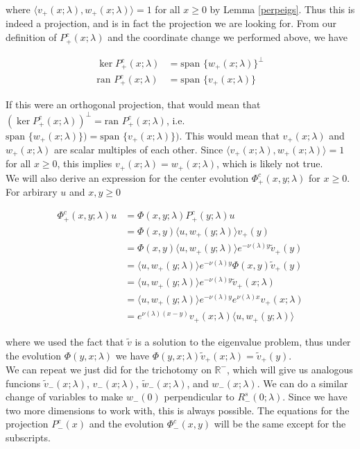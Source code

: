 \documentclass[12pt]{article}
\def\R{{\mathbb R}}
\begin{document}
where $\langle v_+(x; \lambda), w_+(x; \lambda) \rangle = 1$ for all $x \geq 0$ by Lemma \ref{perpeigs}. Thus this is indeed a projection, and is in fact the projection we are looking for. From our definition of $P^c_+(x; \lambda)$ and the coordinate change we performed above, we have

\begin{align*}
\ker P^c_+(x; \lambda) &= \text{span }\{ w_+(x; \lambda) \}^\perp\\
\text{ran } P^c_+(x; \lambda) &= \text{span }\{ v_+(x; \lambda) \}
\end{align*}

If this were an orthogonal projection, that would mean that $(\ker P^c_+(x; \lambda))^\perp = \text{ran } P^c_+(x; \lambda)$, i.e. $\text{span }\{ w_+(x; \lambda) \}) = \text{span }\{ v_+(x; \lambda) \})$. This would mean that $v_+(x; \lambda)$ and $w_+(x; \lambda)$ are scalar multiples of each other. Since $\langle v_+(x; \lambda), w_+(x; \lambda) \rangle = 1$ for all $x \geq 0$, this implies $v_+(x; \lambda) = w_+(x; \lambda)$, which is likely not true. \\

We will also derive an expression for the center evolution $\Phi^c_+(x,y; \lambda)$ for $x \geq 0$. For arbirary $u$ and $x, y \geq 0$

\begin{align*}
\Phi^c_+(x,y; \lambda)u &= \Phi(x,y; \lambda) P^c_+(y; \lambda) u \\
&= \Phi(x,y) \langle u, w_+(y; \lambda) \rangle v_+(y) \\
&= \Phi(x,y) \langle u, w_+(y; \lambda) \rangle e^{-\nu(\lambda)y} \tilde{v}_+(y) \\
&= \langle u, w_+(y; \lambda) \rangle e^{-\nu(\lambda)y} \Phi(x,y) \tilde{v}_+(y) \\
&= \langle u, w_+(y; \lambda) \rangle e^{-\nu(\lambda)y} \tilde{v}_+(x; \lambda) \\
&= \langle u, w_+(y; \lambda) \rangle e^{-\nu(\lambda)y} e^{\nu(\lambda)x} v_+(x; \lambda) \\
&= e^{\nu(\lambda)(x-y)} v_+(x; \lambda) \langle u, w_+(y; \lambda) \rangle 
\end{align*}

where we used the fact that $\tilde{v}$ is a solution to the eigenvalue problem, thus under the evolution $\Phi(y, x; \lambda)$ we have $\Phi(y, x; \lambda)\tilde{v}_+(x; \lambda) = \tilde{v}_+(y)$.\\

We can repeat we just did for the trichotomy on $\R^-$, which will give us analogous funcions $\tilde{v}_-(x; \lambda)$, $v_-(x; \lambda)$, $\tilde{w}_-(x; \lambda)$, and $w_-(x; \lambda)$. We can do a similar change of variables to make $w_-(0)$ perpendicular to $R^s_-(0; \lambda)$. Since we have two more dimensions to work with, this is always possible. The equations for the projection $P^c_-(x)$ and the evolution $\Phi^c_-(x,y)$ will be the same except for the subscripts.\\
\end{document}
